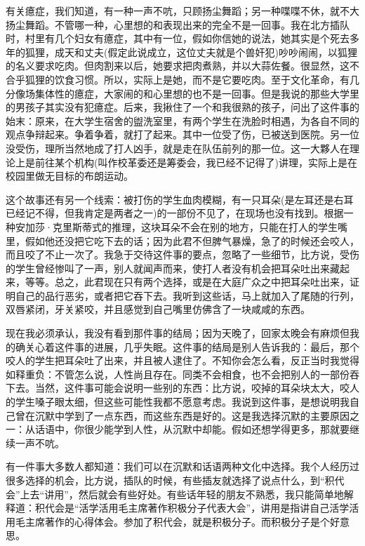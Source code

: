 有关癔症，我们知道，有一种一声不吭，只顾扬尘舞蹈；另一种喋喋不休，就不大扬尘舞蹈。不管哪一种，心里想的和表现出来的完全不是一回事。我在北方插队时，村里有几个妇女有癔症，其中有一位，假如你信她的说法，她其实是个死去多年的狐狸，成天和丈夫(假定此说成立，这位丈夫就是个兽奸犯)吵吵闹闹，以狐狸的名义要求吃肉。但肉割来以后，她要求把肉煮熟，并以大蒜佐餐。很显然，这不合乎狐狸的饮食习惯。所以，实际上是她，而不是它要吃肉。至于文化革命，有几分像场集体性的癔症，大家闹的和心里想的也不是一回事。但是我说的那些大学里的男孩子其实没有犯癔症。后来，我揪住了一个和我很熟的孩子，问出了这件事的始末：原来，在大学生宿舍的盥洗室里，有两个学生在洗脸时相遇，为各自不同的观点争辩起来。争着争着，就打了起来。其中一位受了伤，已被送到医院。另一位没受伤，理所当然地成了打人凶手，就是走在队伍前列的那一位。这一大夥人在理论上是前往某个机构(叫作校革委还是筹委会，我已经不记得了)讲理，实际上是在校园里做无目标的布朗运动。 

这个故事还有另一个线索：被打伤的学生血肉模糊，有一只耳朵(是左耳还是右耳已经记不得，但我肯定是两者之一)的一部份不见了，在现场也没有找到。根据一种安加莎·克里斯蒂式的推理，这块耳朵不会在别的地方，只能在打人的学生嘴里，假如他还没把它吃下去的话；因为此君不但脾气暴燥，急了的时候还会咬人，而且咬了不止一次了。我急于交待这件事的要点，忽略了一些细节，比方说，受伤的学生曾经惨叫了一声，别人就闻声而来，使打人者没有机会把耳朵吐出来藏起来，等等。总之，此君现在只有两个选择，或是在大庭广众之中把耳朵吐出来，证明自己的品行恶劣，或者把它吞下去。我听到这些话，马上就加入了尾随的行列，双唇紧闭，牙关紧咬，并且感觉到自己嘴里仿佛含了一块咸咸的东西。 

现在我必须承认，我没有看到那件事的结局；因为天晚了，回家太晚会有麻烦但我的确关心着这件事的进展，几乎失眠。这件事的结局是别人告诉我的：最后，那个咬人的学生把耳朵吐了出来，并且被人逮住了。不知你会怎么看，反正当时我觉得如释重负：不管怎么说，人性尚且存在。同类不会相食，也不会把别人的一部份吞下去。当然，这件事可能会说明一些别的东西：比方说，咬掉的耳朵块太大，咬人的学生嗓子眼太细，但这些可能性我都不愿意考虑。我说到这件事，是想说明我自己曾在沉默中学到了一点东西，而这些东西是好的。这是我选择沉默的主要原因之一：从话语中，你很少能学到人性，从沉默中却能。假如还想学得更多，那就要继续一声不吭。 

有一件事大多数人都知道：我们可以在沉默和话语两种文化中选择。我个人经历过很多选择的机会，比方说，插队的时候，有些插友就选择了说点什么，到“积代会”上去“讲用”，然后就会有些好处。有些话年轻的朋友不熟悉，我只能简单地解释道：积代会是“活学活用毛主席著作积极分子代表大会”，讲用是指讲自己活学活用毛主席著作的心得体会。参加了积代会，就是积极分子。而积极分子是个好意思。 

